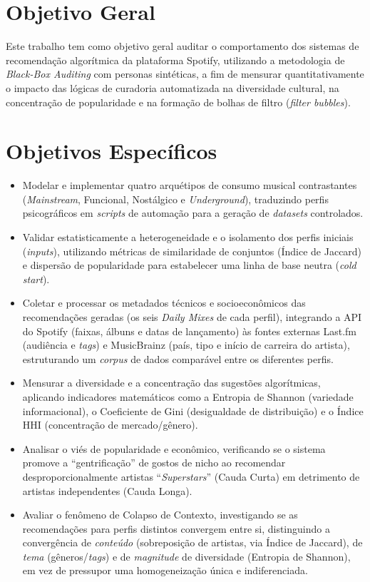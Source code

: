 \documentclass[12pt, %
openright,
oneside, %
a4paper,    %
english,   %
brazil]{facom-ufu-abntex2}
\begin{document}
\section{Objetivo Geral}

Este trabalho tem como objetivo geral auditar o comportamento dos sistemas de
recomendação algorítmica da plataforma Spotify, utilizando a metodologia de
\emph{Black-Box Auditing} com personas sintéticas, a fim de mensurar
quantitativamente o impacto das lógicas de curadoria automatizada na diversidade
cultural, na concentração de popularidade e na formação de bolhas de filtro
(\emph{filter bubbles}).

\section{Objetivos Específicos}

\begin{itemize}
  \item Modelar e implementar quatro arquétipos de consumo musical contrastantes
  (\emph{Mainstream}, Funcional, Nostálgico e \emph{Underground}), traduzindo
  perfis psicográficos em \emph{scripts} de automação para a geração de
  \emph{datasets} controlados.

  \item Validar estatisticamente a heterogeneidade e o isolamento dos perfis
  iniciais (\emph{inputs}), utilizando métricas de similaridade de conjuntos
  (Índice de Jaccard) e dispersão de popularidade para estabelecer uma linha de
  base neutra (\emph{cold start}).

  \item Coletar e processar os metadados técnicos e
  socioeconômicos das recomendações geradas (os seis \emph{Daily Mixes} de cada
  perfil), integrando a API do Spotify (faixas, álbuns e datas de lançamento) às
  fontes externas Last.fm (audiência e \emph{tags}) e MusicBrainz (país, tipo e
  início de carreira do artista), estruturando um \emph{corpus} de dados
  comparável entre os diferentes perfis.

  \item Mensurar a diversidade e a concentração das sugestões algorítmicas,
  aplicando indicadores matemáticos como a Entropia de Shannon (variedade
  informacional), o Coeficiente de Gini (desigualdade de distribuição) e o
  Índice HHI (concentração de mercado/gênero).

  \item Analisar o viés de popularidade e econômico, verificando se o sistema
  promove a ``gentrificação'' de gostos de nicho ao recomendar
  desproporcionalmente artistas ``\emph{Superstars}'' (Cauda Curta) em detrimento
  de artistas independentes (Cauda Longa).

  \item Avaliar o fenômeno de Colapso de Contexto, investigando se as
  recomendações para perfis distintos convergem entre si, distinguindo a
  convergência de \emph{conteúdo} (sobreposição de artistas, via Índice de
  Jaccard), de \emph{tema} (gêneros/\emph{tags}) e de \emph{magnitude} de
  diversidade (Entropia de Shannon), em vez de pressupor uma homogeneização
  única e indiferenciada.
\end{itemize}
\end{document}
